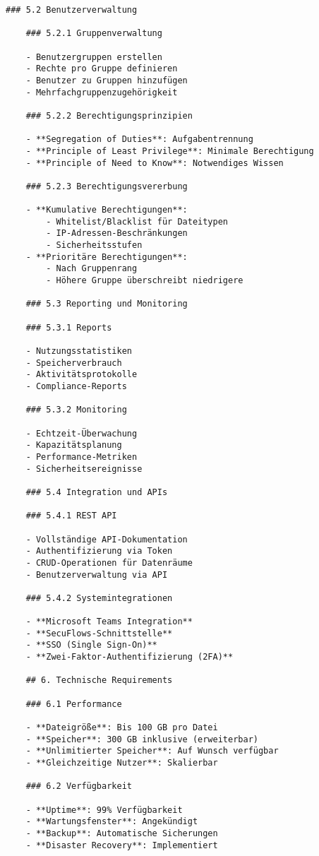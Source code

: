 \begin{Verbatim}[breaklines=true]
    ### 5.2 Benutzerverwaltung
    
    ### 5.2.1 Gruppenverwaltung
    
    - Benutzergruppen erstellen
    - Rechte pro Gruppe definieren
    - Benutzer zu Gruppen hinzufügen
    - Mehrfachgruppenzugehörigkeit
    
    ### 5.2.2 Berechtigungsprinzipien
    
    - **Segregation of Duties**: Aufgabentrennung
    - **Principle of Least Privilege**: Minimale Berechtigung
    - **Principle of Need to Know**: Notwendiges Wissen
    
    ### 5.2.3 Berechtigungsvererbung
    
    - **Kumulative Berechtigungen**:
        - Whitelist/Blacklist für Dateitypen
        - IP-Adressen-Beschränkungen
        - Sicherheitsstufen
    - **Prioritäre Berechtigungen**:
        - Nach Gruppenrang
        - Höhere Gruppe überschreibt niedrigere
    
    ### 5.3 Reporting und Monitoring
    
    ### 5.3.1 Reports
    
    - Nutzungsstatistiken
    - Speicherverbrauch
    - Aktivitätsprotokolle
    - Compliance-Reports
    
    ### 5.3.2 Monitoring
    
    - Echtzeit-Überwachung
    - Kapazitätsplanung
    - Performance-Metriken
    - Sicherheitsereignisse
    
    ### 5.4 Integration und APIs
    
    ### 5.4.1 REST API
    
    - Vollständige API-Dokumentation
    - Authentifizierung via Token
    - CRUD-Operationen für Datenräume
    - Benutzerverwaltung via API
    
    ### 5.4.2 Systemintegrationen
    
    - **Microsoft Teams Integration**
    - **SecuFlows-Schnittstelle**
    - **SSO (Single Sign-On)**
    - **Zwei-Faktor-Authentifizierung (2FA)**
    
    ## 6. Technische Requirements
    
    ### 6.1 Performance
    
    - **Dateigröße**: Bis 100 GB pro Datei
    - **Speicher**: 300 GB inklusive (erweiterbar)
    - **Unlimitierter Speicher**: Auf Wunsch verfügbar
    - **Gleichzeitige Nutzer**: Skalierbar
    
    ### 6.2 Verfügbarkeit
    
    - **Uptime**: 99% Verfügbarkeit
    - **Wartungsfenster**: Angekündigt
    - **Backup**: Automatische Sicherungen
    - **Disaster Recovery**: Implementiert
    

\end{Verbatim}
